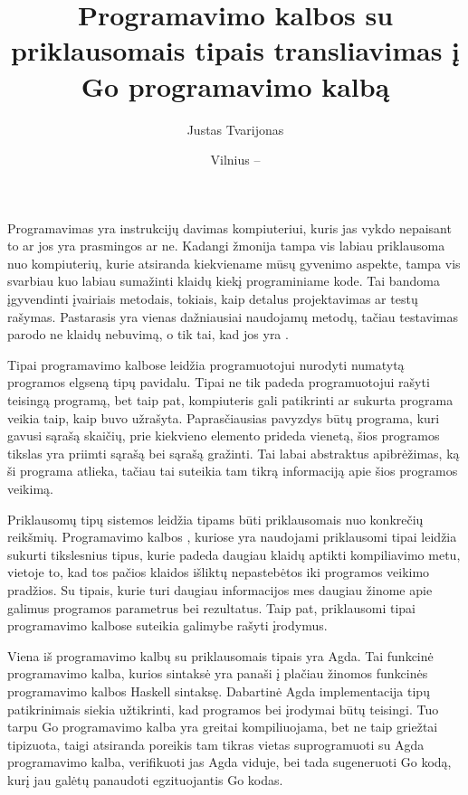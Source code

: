 \documentclass{VUMIFPSkursinis}
\title{Programavimo kalbos su priklausomais tipais transliavimas į Go programavimo kalbą}
\author{Justas Tvarijonas}
\date{Vilnius – \the\year}
\begin{document}
\maketitle
{}
Programavimas yra instrukcijų davimas kompiuteriui, kuris jas vykdo nepaisant to ar jos yra prasmingos ar ne. Kadangi žmonija tampa vis labiau priklausoma nuo kompiuterių, kurie atsiranda kiekviename mūsų gyvenimo aspekte, tampa vis svarbiau kuo labiau sumažinti klaidų kiekį programiniame kode. Tai bandoma įgyvendinti įvairiais metodais, tokiais, kaip detalus projektavimas ar testų rašymas. Pastarasis yra vienas dažniausiai naudojamų metodų, tačiau testavimas parodo ne klaidų nebuvimą, o tik tai, kad jos yra \cite{UHC}.
\par Tipai programavimo kalbose leidžia programuotojui nurodyti numatytą programos elgseną tipų pavidalu. Tipai ne tik padeda programuotojui rašyti teisingą programą, bet taip pat, kompiuteris gali patikrinti ar sukurta programa veikia taip, kaip buvo užrašyta. Paprasčiausias pavyzdys būtų programa, kuri gavusi sąrašą skaičių, prie kiekvieno elemento prideda vienetą, šios programos tikslas yra priimti sąrašą bei sąrašą gražinti. Tai labai abstraktus apibrėžimas, ką ši programa atlieka, tačiau tai suteikia tam tikrą informaciją apie šios programos veikimą.\par
Priklausomų tipų sistemos \cite{schematicApproach} leidžia tipams būti priklausomais nuo konkrečių reikšmių. Programavimo kalbos \cite{agda_book,idris}, kuriose yra naudojami priklausomi tipai leidžia sukurti tikslesnius tipus, kurie padeda daugiau klaidų aptikti kompiliavimo metu, vietoje to, kad tos pačios klaidos išliktų nepastebėtos iki programos veikimo pradžios. Su tipais, kurie turi daugiau informacijos mes daugiau žinome apie galimus programos parametrus bei rezultatus. Taip pat, priklausomi tipai programavimo kalbose suteikia galimybe rašyti įrodymus.
\par Viena iš programavimo kalbų su priklausomais tipais yra Agda. Tai funkcinė programavimo kalba, kurios sintaksė yra panaši į plačiau žinomos funkcinės programavimo kalbos Haskell \cite{haskell} sintaksę. Dabartinė Agda implementacija tipų patikrinimais siekia užtikrinti, kad programos bei įrodymai būtų teisingi. Tuo tarpu Go programavimo kalba \cite{Go} yra greitai kompiliuojama, bet ne taip griežtai tipizuota, taigi atsiranda poreikis tam tikras vietas suprogramuoti su Agda programavimo kalba, verifikuoti jas Agda viduje, bei tada sugeneruoti Go kodą, kurį jau galėtų panaudoti egzituojantis Go kodas.
\end{document}
